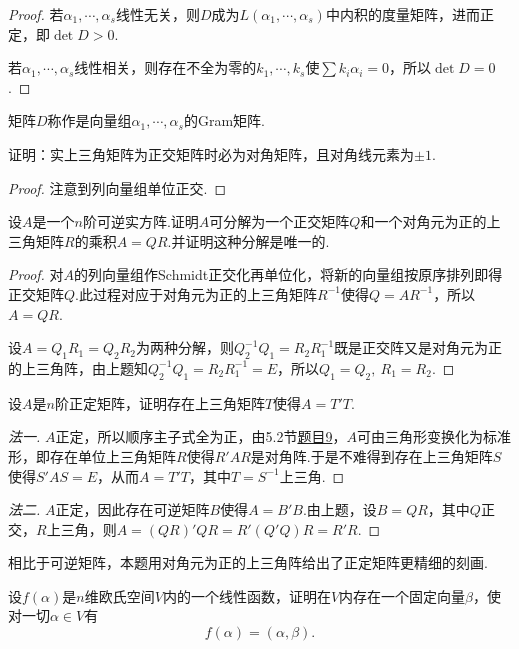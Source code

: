 \begin{proof}
	若$\alpha_1,\cdots,\alpha_s$线性无关，则$D$成为$L(\alpha_1,\cdots,\alpha_s)$中内积的度量矩阵，进而正定，即$\det D>0$.

	若$\alpha_1,\cdots,\alpha_s$线性相关，则存在不全为零的$k_1,\cdots,k_s$使$\sum k_i\alpha_i=0$，所以$\det D=0$.
\end{proof}
\begin{note}
	矩阵$D$称作是向量组$\alpha_1,\cdots,\alpha_s$的Gram矩阵.
\end{note}
\begin{prob}[17]
	证明：实上三角矩阵为正交矩阵时必为对角矩阵，且对角线元素为$\pm 1$.
\end{prob}
\begin{proof}
	注意到列向量组单位正交.
\end{proof}
\begin{prob}[18]
	设$A$是一个$n$阶可逆实方阵.证明$A$可分解为一个正交矩阵$Q$和一个对角元为正的上三角矩阵$R$的乘积$A=QR$.并证明这种分解是唯一的\footnotemark.
\end{prob}
\begin{proof}
	对$A$的列向量组作Schmidt正交化再单位化，将新的向量组按原序排列即得正交矩阵$Q$.此过程对应于对角元为正的上三角矩阵$R^{-1}$使得$Q=AR^{-1}$，所以$A=QR$.

	设$A=Q_1R_1=Q_2R_2$为两种分解，则$Q_2^{-1}Q_1=R_2R_1^{-1}$既是正交阵又是对角元为正的上三角阵，由上题知$Q_2^{-1}Q_1=R_2R_1^{-1}=E$，所以$Q_1=Q_2,\ R_1=R_2$.
\end{proof}
\begin{prob}[19]
	设$A$是$n$阶正定矩阵，证明存在上三角矩阵$T$使得$A=T'T$.
\end{prob}
\begin{proof}[法一]
	$A$正定，所以顺序主子式全为正，由5.2节\hyperlink{TriangleTransformation}{题目9}，$A$可由三角形变换化为标准形，即存在单位上三角矩阵$R$使得$R'AR$是对角阵.于是不难得到存在上三角矩阵$S$使得$S'AS=E$，从而$A=T'T$，其中$T=S^{-1}$上三角.
\end{proof}
\begin{proof}[法二]
	$A$正定，因此存在可逆矩阵$B$使得$A=B'B$.由上题，设$B=QR$，其中$Q$正交，$R$上三角，则$A=(QR)'QR=R'(Q'Q)R=R'R$.
\end{proof}
\begin{note}
	相比于可逆矩阵，本题用对角元为正的上三角阵给出了正定矩阵更精细的刻画.
\end{note}
\begin{prob}[20]
	设$f(\alpha)$是$n$维欧氏空间$V$内的一个线性函数，证明在$V$内存在一个固定向量$\beta$，使对一切$\alpha\in V$有
	\[
		f(\alpha)=(\alpha,\beta).
	\]
\end{prob}
